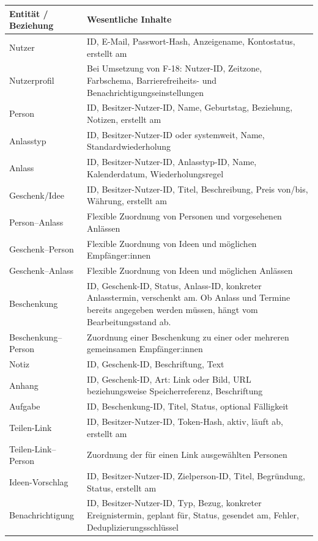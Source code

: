 \documentclass[11pt,a4paper]{article}
\begin{document}
\begin{tabularx}{\linewidth}{@{}p{4cm} Y@{}}
\toprule
\textbf{Entität / Beziehung} & \textbf{Wesentliche Inhalte} \\
\midrule
\endhead
Nutzer & ID, E-Mail, Passwort-Hash, Anzeigename, Kontostatus, erstellt am \\
Nutzerprofil & Bei Umsetzung von F-18: Nutzer-ID, Zeitzone, Farbschema, Barrierefreiheits- und Benachrichtigungseinstellungen \\
Person & ID, Besitzer-Nutzer-ID, Name, Geburtstag, Beziehung, Notizen, erstellt am \\
Anlasstyp & ID, Besitzer-Nutzer-ID oder systemweit, Name, Standardwiederholung \\
Anlass & ID, Besitzer-Nutzer-ID, Anlasstyp-ID, Name, Kalenderdatum, Wiederholungsregel \\
Geschenk/Idee & ID, Besitzer-Nutzer-ID, Titel, Beschreibung, Preis von/bis, Währung, erstellt am \\
Person–Anlass & Flexible Zuordnung von Personen und vorgesehenen Anlässen \\
Geschenk–Person & Flexible Zuordnung von Ideen und möglichen Empfänger:innen \\
Geschenk–Anlass & Flexible Zuordnung von Ideen und möglichen Anlässen \\
Beschenkung & ID, Geschenk-ID, Status, Anlass-ID, konkreter Anlasstermin, verschenkt am. Ob Anlass und Termine bereits angegeben werden müssen, hängt vom Bearbeitungsstand ab. \\
Beschenkung–Person & Zuordnung einer Beschenkung zu einer oder mehreren gemeinsamen Empfänger:innen \\
Notiz & ID, Geschenk-ID, Beschriftung, Text \\
Anhang & ID, Geschenk-ID, Art: Link oder Bild, URL beziehungsweise Speicherreferenz, Beschriftung \\
Aufgabe & ID, Beschenkung-ID, Titel, Status, optional Fälligkeit \\
Teilen-Link & ID, Besitzer-Nutzer-ID, Token-Hash, aktiv, läuft ab, erstellt am \\
Teilen-Link–Person & Zuordnung der für einen Link ausgewählten Personen \\
Ideen-Vorschlag & ID, Besitzer-Nutzer-ID, Zielperson-ID, Titel, Begründung, Status, erstellt am \\
Benachrichtigung & ID, Besitzer-Nutzer-ID, Typ, Bezug, konkreter Ereignistermin, geplant für, Status, gesendet am, Fehler, Deduplizierungsschlüssel \\
\bottomrule
\end{tabularx}
\end{document}
